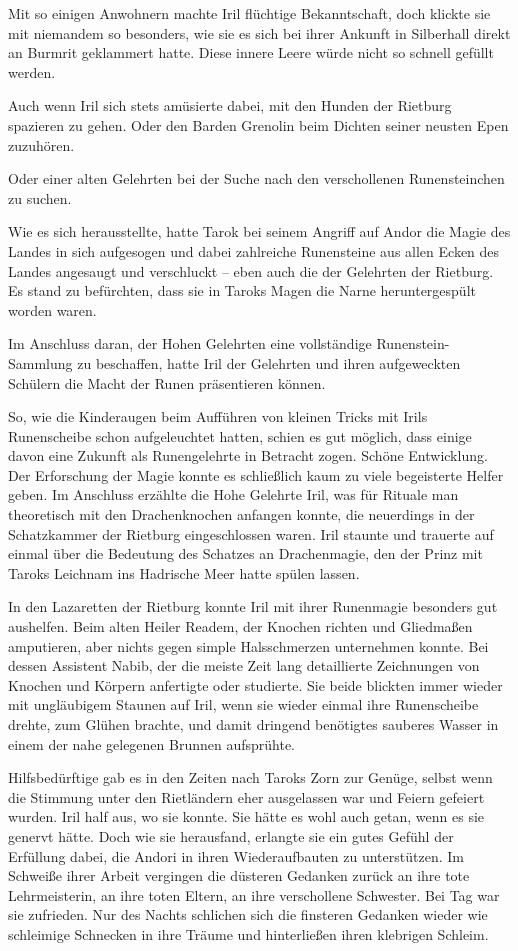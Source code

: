 Mit so einigen Anwohnern machte Iril flüchtige Bekanntschaft, doch klickte sie mit niemandem so besonders, wie sie es sich bei ihrer Ankunft in Silberhall direkt an Burmrit geklammert hatte. Diese innere Leere würde nicht so schnell gefüllt werden.

Auch wenn Iril sich stets amüsierte dabei, mit den Hunden der Rietburg spazieren zu gehen. Oder den Barden Grenolin beim Dichten seiner neusten Epen zuzuhören.

Oder einer alten Gelehrten bei der Suche nach den verschollenen Runensteinchen zu suchen.

Wie es sich herausstellte, hatte Tarok bei seinem Angriff auf Andor die Magie des Landes in sich aufgesogen und dabei zahlreiche Runensteine aus allen Ecken des Landes angesaugt und verschluckt – eben auch die der Gelehrten der Rietburg. Es stand zu befürchten, dass sie in Taroks Magen die Narne heruntergespült worden waren.

Im Anschluss daran, der Hohen Gelehrten eine vollständige Runenstein-Sammlung zu beschaffen, hatte Iril der Gelehrten und ihren aufgeweckten Schülern die Macht der Runen präsentieren können.

So, wie die Kinderaugen beim Aufführen von kleinen Tricks mit Irils Runenscheibe schon aufgeleuchtet hatten, schien es gut möglich, dass einige davon eine Zukunft als Runengelehrte in Betracht zogen. Schöne Entwicklung. Der Erforschung der Magie konnte es schließlich kaum zu viele begeisterte Helfer geben. Im Anschluss erzählte die Hohe Gelehrte Iril, was für Rituale man theoretisch mit den Drachenknochen anfangen konnte, die neuerdings in der Schatzkammer der Rietburg eingeschlossen waren. Iril staunte und trauerte auf einmal über die Bedeutung des Schatzes an Drachenmagie, den der Prinz mit Taroks Leichnam ins Hadrische Meer hatte spülen lassen.

In den Lazaretten der Rietburg konnte Iril mit ihrer Runenmagie besonders gut aushelfen. Beim alten Heiler Readem, der Knochen richten und Gliedmaßen amputieren, aber nichts gegen simple Halsschmerzen unternehmen konnte. Bei dessen Assistent Nabib, der die meiste Zeit lang detaillierte Zeichnungen von Knochen und Körpern anfertigte oder studierte. Sie beide blickten immer wieder mit ungläubigem Staunen auf Iril, wenn sie wieder einmal ihre Runenscheibe drehte, zum Glühen brachte, und damit dringend benötigtes sauberes Wasser in einem der nahe gelegenen Brunnen aufsprühte.

Hilfsbedürftige gab es in den Zeiten nach Taroks Zorn zur Genüge, selbst wenn die Stimmung unter den Rietländern eher ausgelassen war und Feiern gefeiert wurden. Iril half aus, wo sie konnte. Sie hätte es wohl auch getan, wenn es sie genervt hätte. Doch wie sie herausfand, erlangte sie ein gutes Gefühl der Erfüllung dabei, die Andori in ihren Wiederaufbauten zu unterstützen. Im Schweiße ihrer Arbeit vergingen die düsteren Gedanken zurück an ihre tote Lehrmeisterin, an ihre toten Eltern, an ihre verschollene Schwester. Bei Tag war sie zufrieden. Nur des Nachts schlichen sich die finsteren Gedanken wieder wie schleimige Schnecken in ihre Träume und hinterließen ihren klebrigen Schleim.

